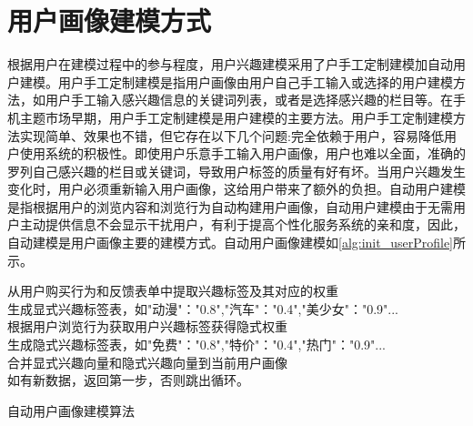     \section{用户画像建模方式}
    根据用户在建模过程中的参与程度，用户兴趣建模采用了户手工定制建模加自动用户建模。用户手工定制建模是指用户画像由用户自己手工输入或选择的用户建模方法，如用户手工输入感兴趣信息的关键词列表，或者是选择感兴趣的栏目等。在手机主题市场早期，用户手工定制建模是用户建模的主要方法。用户手工定制建模方法实现简单、效果也不错，但它存在以下几个问题:完全依赖于用户，容易降低用户使用系统的积极性。即使用户乐意手工输入用户画像，用户也难以全面，准确的罗列自己感兴趣的栏目或关键词，导致用户标签的质量有好有坏。当用户兴趣发生变化时，用户必须重新输入用户画像，这给用户带来了额外的负担。自动用户建模是指根据用户的浏览内容和浏览行为自动构建用户画像，自动用户建模由于无需用户主动提供信息不会显示干扰用户，有利于提高个性化服务系统的亲和度，因此，自动建模是用户画像主要的建模方式。自动用户画像建模如\autoref{alg:init_userProfile}所示。
    \IncMargin{1em}
    \begin{algorithm}
      \BlankLine
        从用户购买行为和反馈表单中提取兴趣标签及其对应的权重\\
        生成显式兴趣标签表，如{"动漫"："0.8","汽车"："0.4","美少女"："0.9"...}\\
        根据用户浏览行为获取用户兴趣标签获得隐式权重\\
        生成隐式兴趣标签表，如{"免费"："0.8","特价"："0.4","热门"："0.9"...}\\
        合并显式兴趣向量和隐式兴趣向量到当前用户画像\\
        如有新数据，返回第一步，否则跳出循环。
    \caption{自动用户画像建模算法}\label{alg:init_userProfile}
    \end{algorithm}
    \DecMargin{1em}


